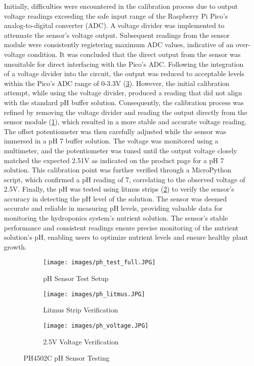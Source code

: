 \documentclass[12pt]{article} %
\begin{document}
\pagebreak
\noindent Initially, difficulties were encountered in the calibration process due to output voltage readings exceeding the safe input range of the Raspberry Pi Pico’s analog-to-digital converter (ADC). A voltage divider was implemented to attenuate the sensor's voltage output. Subsequent readings from the sensor module were consistently registering maximum ADC values, indicative of an over-voltage condition. It was concluded that the direct output from the sensor was unsuitable for direct interfacing with the Pico’s ADC.
Following the integration of a voltage divider into the circuit, the output was reduced to acceptable levels within the Pico's ADC range of 0-3.3V (\ref{fig:ph_voltage}). However, the initial calibration attempt, while using the voltage divider, produced a reading that did not align with the standard pH buffer solution. Consequently, the calibration process was refined by removing the voltage divider and reading the output directly from the sensor module (\ref{fig:ph_test_full}), which resulted in a more stable and accurate voltage reading.
\newline
\newline
\noindent The offset potentiometer was then carefully adjusted while the sensor was immersed in a pH 7 buffer solution. The voltage was monitored using a multimeter, and the potentiometer was tuned until the output voltage closely matched the expected 2.51V as indicated on the product page for a pH 7 solution. This calibration point was further verified through a MicroPython script, which confirmed a pH reading of 7, correlating to the observed voltage of 2.5V. Finally, the pH was tested using litmus strips (\ref{fig:ph_litmus}) to verify the sensor's accuracy in detecting the pH level of the solution. The sensor was deemed accurate and reliable in measuring pH levels, providing valuable data for monitoring the hydroponics system's nutrient solution. The sensor's stable performance and consistent readings ensure precise monitoring of the nutrient solution's pH, enabling users to optimize nutrient levels and ensure healthy plant growth.
\begin{figure}[H]
    \centering
    \begin{subfigure}[b]{0.3\textwidth}
        \centering
        \texttt{[image: images/ph\_test\_full.JPG]}
        \caption{pH Sensor Test Setup}
        \label{fig:ph_test_full}
    \end{subfigure}
    \hfill
    \begin{subfigure}[b]{0.3\textwidth}
        \centering
        \texttt{[image: images/ph\_litmus.JPG]}
        \caption{Litmus Strip Verification}
        \label{fig:ph_litmus}
    \end{subfigure}
    \hfill
    \begin{subfigure}[b]{0.3\textwidth}
        \centering
        \texttt{[image: images/ph\_voltage.JPG]}
        \caption{2.5V Voltage Verification}
        \label{fig:ph_voltage}
    \end{subfigure}
    \caption{PH4502C pH Sensor Testing}
    \label{fig:phTestingComposite}
\end{figure}
\end{document}
